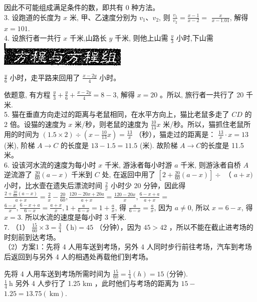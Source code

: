 \documentclass[10pt]{article}
\begin{document}
因此不可能组成满足条件的数，即共有 0 种方法。\\
3. 设跑道的长度为 $x$ 米, 甲、乙速度分别为 $v_{1} 、 v_{2}$, 则 $\frac{v_{1}}{v_{2}}=\frac{x-1}{x-2}=$ $\frac{x}{x-1.01}$, 解得 $x=101$.\\
4. 设旅行者一共行 $x$ 千米,山路长 $y$ 千米, 则他上山需 $\frac{y}{3}$ 小时,下山需\\
\includegraphics[max width=\textwidth, center]{2024_10_30_26b590fd1106d28139f0g-126(1)}\\
$\frac{y}{6}$ 小时，走平路来回用了 $\frac{x-2 y}{4}$ 小时。

依题意, 有方程 $\frac{y}{3}+\frac{y}{6}+\frac{x-2 y}{4}=8-3$, 解得 $x=20$ 。所以, 旅行者一共行了 20 千米.\\
5. 猫在垂直方向走过的距离与老鼠相同，在水平方向上，猫比老鼠多走了 $C D$ 的 2 倍。设猫的速度为 $x$ 米/秒，则老鼠的速度为 $\frac{10}{13} x$ 米/秒。所以，猫抓住老鼠所用的时间为 $(1.5 \times 2) \div\left(x-\frac{10}{13} x\right)=\frac{13}{x}$ （秒），猫走过的距离是： $\frac{13}{x} \cdot x=13$ (米), 阶梯 $A \rightarrow C$ 的长度是 $13-1.5=11.5$ (米). 故阶梯 $A \rightarrow C$的长度是 11.5 米。\\
6. 设该河水流的速度为每小时 $x$ 千米, 游泳者每小时游 $a$ 千米, 则游泳者自桥 $A$ 逆流游了 $\frac{20}{60}(a-x)$ 千米到 $C$ 处, 在返回中用了 $\left[2+\frac{20}{60}(a-x)\right] \div$ （ $a+x)$ 小时，比水壸在遗失后漂流时间 $\frac{2}{x}$ 小时少 20 分钟，因此得 $\frac{2+\frac{20}{60}(a-x)}{a+x}=\frac{2}{x}-\frac{20}{60}, \frac{120-20 x+20 a}{a+x}=\frac{120-20 x}{x}, \frac{6-x+a}{a+x}=$ $\frac{6-x}{x}, \frac{6-x+a}{6-x}=\frac{a+x}{x}, 1+\frac{a}{6-x}=1+\frac{a}{x}$, 得 $\frac{a}{6-x}=\frac{a}{x}$, 因为 $a \neq 0$, 所以 $x=6-x$, 得 $x=3$. 所以水流的速度是每小时 3 千米.\\
7. （1） $\frac{15}{60} \times 3=\frac{3}{4}（\mathrm{~h})=45$ （分钟），因为 $45>42$ ，所以不能在截止进考场的时刻前到达考场。\\
（2）方案1：先将 4 人用车送到考场，另外 4 人同时步行前往考场，汽车到考场后返回到与另外 4 人的相遇处再载他们到考场。

先将 4 人用车送到考场所需时间为 $\frac{15}{60}=\frac{1}{4}(h)=15$ (分钟).\\
$\frac{1}{4} \mathrm{~h}$ 另外 4 人步行了 1.25 km ，此时他们与考场的距离为 $15-$ $1.25=13.75(\mathrm{~km})$.
\end{document}
